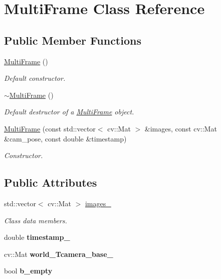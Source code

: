 \hypertarget{classMultiFrame}{}\section{Multi\+Frame Class Reference}
\label{classMultiFrame}
\subsection*{Public Member Functions}
\begin{DoxyCompactItemize}
\item 
\hyperlink{classMultiFrame_a08ec547ed70cf94539b3a52c2b51363b}{Multi\+Frame} ()
\begin{DoxyCompactList}\small\item\em Default constructor. \end{DoxyCompactList}\item 
\mbox{\label{classMultiFrame_a316ec9cec4e1564313cb1dd739701bc0}} 
\hyperlink{classMultiFrame_a316ec9cec4e1564313cb1dd739701bc0}{$\sim$\+Multi\+Frame} ()
\begin{DoxyCompactList}\small\item\em Default destructor of a \hyperlink{classMultiFrame}{Multi\+Frame} object. \end{DoxyCompactList}\item 
\hyperlink{classMultiFrame_a381ae26db28aaf27bf0966e274a36e2a}{Multi\+Frame} (const std\+::vector$<$ cv\+::\+Mat $>$ \&images, const cv\+::\+Mat \&cam\+\_\+pose, const double \&timestamp)
\begin{DoxyCompactList}\small\item\em Constructor. \end{DoxyCompactList}\end{DoxyCompactItemize}
\subsection*{Public Attributes}
\begin{DoxyCompactItemize}
\item 
\mbox{\label{classMultiFrame_a582643f882bf528e1e79019fadd10c58}} 
std\+::vector$<$ cv\+::\+Mat $>$ \hyperlink{classMultiFrame_a582643f882bf528e1e79019fadd10c58}{images\+\_\+}
\begin{DoxyCompactList}\small\item\em Class data members. \end{DoxyCompactList}\item 
\mbox{\label{classMultiFrame_a50c22f3238a428ca1ee55174ffb59d9a}} 
double {\bfseries timestamp\+\_\+}
\item 
\mbox{\label{classMultiFrame_a4f8bd6e70241fe7f8b62e4e392cac480}} 
cv\+::\+Mat {\bfseries world\+\_\+\+Tcamera\+\_\+base\+\_\+}
\item 
\mbox{\label{classMultiFrame_ae44bc3209f66f83c563fd6f9da44f6ef}} 
bool {\bfseries b\+\_\+empty}
\end{DoxyCompactItemize}


